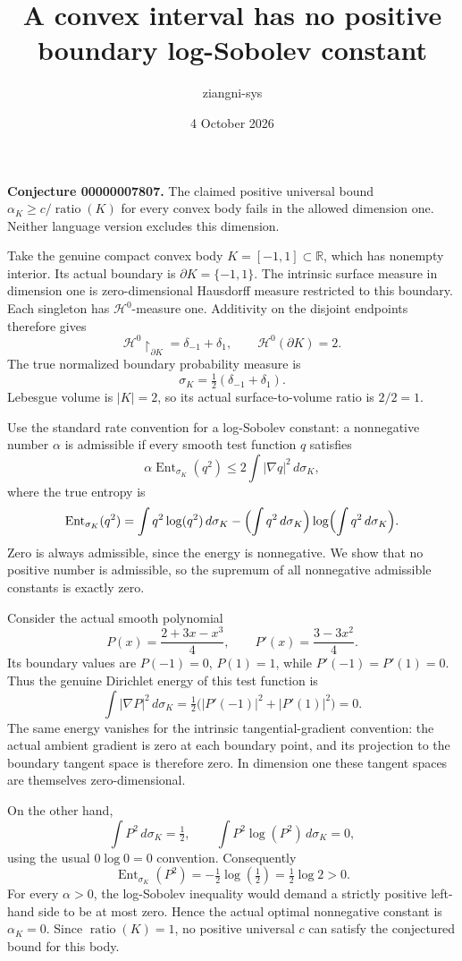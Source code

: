 \documentclass[11pt]{article}
\title{A convex interval has no positive boundary log-Sobolev constant}
\author{ziangni-sys}
\date{4 October 2026}
\begin{document}
\maketitle
\noindent\textbf{Conjecture 00000007807.} The claimed positive universal bound $\alpha_K\geq c/\operatorname{ratio}(K)$ for every convex body fails in the allowed dimension one. Neither language version excludes this dimension.

Take the genuine compact convex body $K=[-1,1]\subset\mathbb R$, which has nonempty interior. Its actual boundary is $\partial K=\{-1,1\}$. The intrinsic surface measure in dimension one is zero-dimensional Hausdorff measure restricted to this boundary. Each singleton has $\mathcal H^0$-measure one. Additivity on the disjoint endpoints therefore gives
\[
 \mathcal H^0\!\restriction_{\partial K}=\delta_{-1}+\delta_1,
 \qquad \mathcal H^0(\partial K)=2.
\]
The true normalized boundary probability measure is
\[
 \sigma_K=\tfrac12(\delta_{-1}+\delta_1).
\]
Lebesgue volume is $|K|=2$, so its actual surface-to-volume ratio is $2/2=1$.

Use the standard rate convention for a log-Sobolev constant: a nonnegative number $\alpha$ is admissible if every smooth test function $q$ satisfies
\[
 \alpha\operatorname{Ent}_{\sigma_K}(q^2)
 \leq 2\int |\nabla q|^2\,d\sigma_K,
\]
where the true entropy is
\[
 \operatorname{Ent}_{\sigma_K}(q^2)
 =\int q^2\log(q^2)\,d\sigma_K
 -\Bigl(\int q^2\,d\sigma_K\Bigr)
 \log\Bigl(\int q^2\,d\sigma_K\Bigr).
\]
Zero is always admissible, since the energy is nonnegative. We show that no positive number is admissible, so the supremum of all nonnegative admissible constants is exactly zero.

Consider the actual smooth polynomial
\[
 P(x)=\frac{2+3x-x^3}{4},\qquad
 P'(x)=\frac{3-3x^2}{4}.
\]
Its boundary values are $P(-1)=0$, $P(1)=1$, while $P'(-1)=P'(1)=0$. Thus the genuine Dirichlet energy of this test function is
\[
 \int |\nabla P|^2\,d\sigma_K
 =\tfrac12\bigl(|P'(-1)|^2+|P'(1)|^2\bigr)=0.
\]
The same energy vanishes for the intrinsic tangential-gradient convention: the actual ambient gradient is zero at each boundary point, and its projection to the boundary tangent space is therefore zero. In dimension one these tangent spaces are themselves zero-dimensional.

On the other hand,
\[
 \int P^2\,d\sigma_K=\tfrac12,
 \qquad \int P^2\log(P^2)\,d\sigma_K=0,
\]
using the usual $0\log0=0$ convention. Consequently
\[
 \operatorname{Ent}_{\sigma_K}(P^2)
 =-\tfrac12\log(\tfrac12)=\tfrac12\log2>0.
\]
For every $\alpha>0$, the log-Sobolev inequality would demand a strictly positive left-hand side to be at most zero. Hence the actual optimal nonnegative constant is $\alpha_K=0$. Since $\operatorname{ratio}(K)=1$, no positive universal $c$ can satisfy the conjectured bound for this body.
\end{document}
